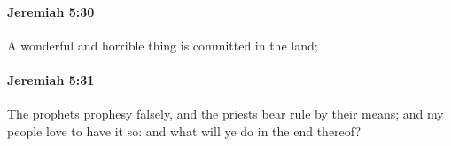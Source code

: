 		\paragraph{Jeremiah 5:30} %
			\label{JEREMIAH-5-30}

			A wonderful and horrible thing is committed in the land;


		\paragraph{Jeremiah 5:31} %
			\label{JEREMIAH-5-31}

			The prophets prophesy falsely, and the priests bear rule by their means; and my people love to have it so: and what will ye do in the end thereof?

